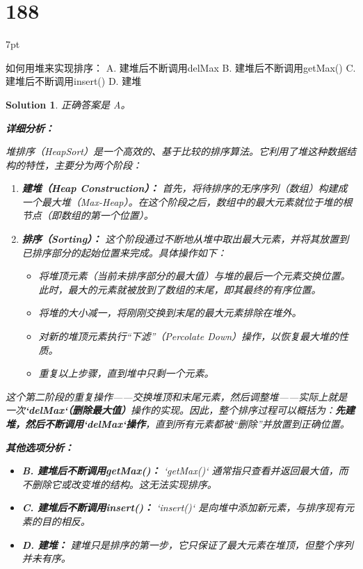 \documentclass[UTF8]{report}
\newtheorem{solution}{Solution}
\theoremstyle{MyLineTheoremStyle} %
\theoremstyle{MyBlockTheoremStyle} %
\theoremstyle{MySubsubsectionStyle} %
\newenvironment{graybox}{%
        \def\FrameCommand{%
        \hspace{1pt}%
        {\color{gray}\small \vrule width 2pt}%
        {\color{graybox_color}\vrule width 4pt}%
        \colorbox{graybox_color}%
        }%
        \MakeFramed{\advance\hsize-\width\FrameRestore}%
        \noindent\hspace{-4.55pt}%
        \begin{adjustwidth}{}{7pt}%
        \vspace{2pt}\vspace{2pt}%
        }
        {%
        \vspace{2pt}\end{adjustwidth}\endMakeFramed%
        }
\begin{document}
\section*{188}
\begin{graybox}
如何用堆来实现排序：
A. 建堆后不断调用delMax
B. 建堆后不断调用getMax()
C. 建堆后不断调用insert()
D. 建堆
\end{graybox}

\begin{solution}
正确答案是 A。

\textbf{详细分析：}

堆排序（HeapSort）是一个高效的、基于比较的排序算法。它利用了堆这种数据结构的特性，主要分为两个阶段：

\begin{enumerate}
    \item \textbf{建堆（Heap Construction）：}
    首先，将待排序的无序序列（数组）构建成一个最大堆（Max-Heap）。在这个阶段之后，数组中的最大元素就位于堆的根节点（即数组的第一个位置）。

    \item \textbf{排序（Sorting）：}
    这个阶段通过不断地从堆中取出最大元素，并将其放置到已排序部分的起始位置来完成。具体操作如下：
    \begin{itemize}
        \item 将堆顶元素（当前未排序部分的最大值）与堆的最后一个元素交换位置。此时，最大的元素就被放到了数组的末尾，即其最终的有序位置。
        \item 将堆的大小减一，将刚刚交换到末尾的最大元素排除在堆外。
        \item 对新的堆顶元素执行“下滤”（Percolate Down）操作，以恢复最大堆的性质。
        \item 重复以上步骤，直到堆中只剩一个元素。
    \end{itemize}
\end{enumerate}

这个第二阶段的重复操作——交换堆顶和末尾元素，然后调整堆——实际上就是一次\textbf{`delMax`（删除最大值）}操作的实现。因此，整个排序过程可以概括为：\textbf{先建堆，然后不断调用`delMax`操作}，直到所有元素都被“删除”并放置到正确位置。

\textbf{其他选项分析：}
\begin{itemize}
    \item \textbf{B. 建堆后不断调用getMax()：} `getMax()` 通常指只查看并返回最大值，而不删除它或改变堆的结构。这无法实现排序。
    \item \textbf{C. 建堆后不断调用insert()：} `insert()` 是向堆中添加新元素，与排序现有元素的目的相反。
    \item \textbf{D. 建堆：} 建堆只是排序的第一步，它只保证了最大元素在堆顶，但整个序列并未有序。
\end{itemize}
\end{solution}
\end{document}
